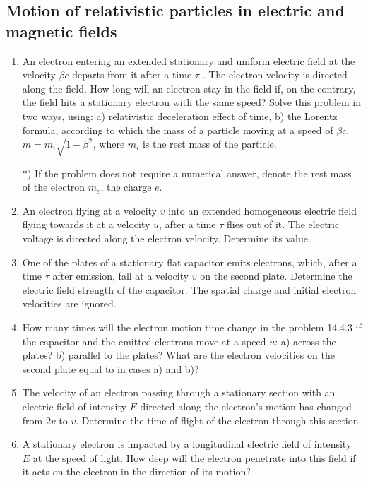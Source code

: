 \documentclass{article}
\begin{document}
\subsection{Motion of relativistic particles in electric and magnetic fields}

\begin{enumerate}[label=14.4.\arabic*]

\item An electron entering an extended stationary and uniform electric field at the velocity $\beta c$ departs from it after a time $\tau$ . The electron velocity is directed along the field. How long will an electron stay in the field if, on the contrary, the field hits a stationary electron with the same speed? Solve this problem in two ways, using: a) relativistic deceleration effect of time, b) the Lorentz formula, according to which the mass of a particle moving at a speed of $\beta c$,$m = {m_i}{\sqrt{1 - \beta^2}}$, where $m_i$ is the rest mass of the particle.

$\ast$) If the problem does not require a numerical answer, denote the rest mass of the electron $m_e$, the charge $e$.

\item An electron flying at a velocity $v$ into an extended homogeneous electric field flying towards it at a velocity $u$, after a time $\tau$ flies out of it. The electric voltage is directed along the electron velocity. Determine its value.

\item One of the plates of a stationary flat capacitor emits electrons, which, after a time $\tau$ after emission, fall at a velocity $v$ on the second plate. Determine the electric field strength of the capacitor. The spatial charge and initial electron velocities are ignored.

\item How many times will the electron motion time change in the problem 14.4.3 if the capacitor and the emitted electrons move at a speed $u$: a) across the plates? b) parallel to the plates? What are the electron velocities on the second plate equal to in cases a) and b)?

\item The velocity of an electron passing through a stationary section with an electric field of intensity $E$ directed along the electron's motion has changed from $2v$ to $v$. Determine the time of flight of the electron through this section.

\item A stationary electron is impacted by a longitudinal electric field of intensity $E$ at the speed of light. How deep will the electron penetrate into this field if it acts on the electron in the direction of its motion?


\end{enumerate}
\end{document}
